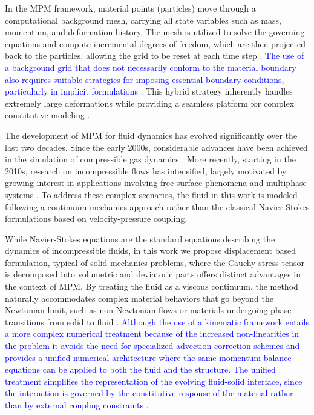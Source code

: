\documentclass[11pt,english]{article}
\newcommand{\LM}[1]{\textcolor{blue}{#1}}
\begin{document}
    
    In the MPM framework, material points (particles) move through a computational background mesh, carrying all state variables such as mass, momentum, and deformation history. The mesh is utilized to solve the governing equations and compute incremental degrees of freedom, which are then projected back to the particles, allowing the grid to be reset at each time step \cite{zhang2016material}. \LM{The use of a background grid that does not necessarily conform to the material boundary also requires suitable strategies for imposing essential boundary conditions, particularly in implicit formulations \cite{singer2024lagrange}}. This hybrid strategy inherently handles extremely large deformations \cite{wikeckowski2004material} while providing a seamless platform for complex constitutive modeling \cite{fern2016role,fern2019material}. 

    The development of MPM for fluid dynamics has evolved significantly over the last two decades. Since the early 2000s, considerable advances have been achieved in the simulation of compressible gas dynamics \cite{ma2009simulation,tran2010solving}. More recently, starting in the 2010s, research on incompressible flows has intensified, largely motivated by growing interest in applications involving free-surface phenomena \cite{mast2012mitigating, li2014sloshing} and multiphase systems \cite{mackenzie2010modeling}. To address these complex scenarios, the fluid in this work is modeled following a continuum mechanics approach rather than the classical Navier-Stokes formulations based on velocity-pressure coupling.


     While Navier-Stokes equations are the standard equations describing the dynamics of incompressible fluids, in this work we propose displacement based formulation, typical of solid mechanics problems,  where the Cauchy stress tensor is decomposed into volumetric and deviatoric parts offers distinct advantages in the context of MPM. By treating the fluid as a viscous continuum, the method naturally accommodates complex material behaviors that go beyond the Newtonian limit, such as non-Newtonian flows or materials undergoing phase transitions from solid to fluid \cite{cotela2017simulation,onate2004possibilities}. \LM{Although the use of a kinematic framework entails a more complex numerical treatment because of the increased non-linearities in the problem it avoids the need for specialized advection-correction schemes and provides a unified numerical architecture where the same momentum balance equations can be applied to both the fluid and the structure. The unified treatment simplifies the representation of the evolving fluid-solid interface, since the interaction is governed by the constitutive response of the material rather than by external coupling constraints \cite{castanar2026study,dunatunga2015continuum}.}
\end{document}
